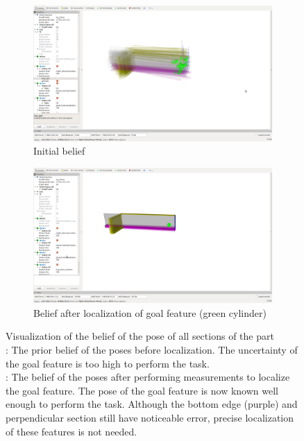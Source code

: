 \documentclass[../thesis.tex]{subfiles}
\begin{document}
\begin{figure}
  \centering
  \begin{subfigure}[b]{0.4\linewidth}
    \includegraphics[width=\linewidth, clip, trim=8in 6in 8.5in 4in]{./Localization/UnlocalizedBelief}
    \caption{Initial belief}
    \label{fig:FullBelief:Unlocalized}
  \end{subfigure}
  \hfill
  \begin{subfigure}[b]{0.4\linewidth}
    \includegraphics[width=\linewidth, clip, trim=7in 7in 10in 4in]{./Localization/LocalizedBelief}
    \caption{Belief after localization of goal feature (green cylinder)}
    \label{fig:FullBelief:Localized}
  \end{subfigure}
  \caption{
    Visualization of the belief of the pose of all sections of the part\\
\protect{}: The prior belief of the poses before localization. The uncertainty of the goal feature is too high to perform the task.\\ 
\protect{}: The belief of the poses after performing measurements to localize the goal feature. The pose of the goal feature is now known well enough to perform the task. Although the bottom edge (purple) and perpendicular section still have noticeable error, precise localization of these features is not needed.
}
  \label{fig:FullBelief}
\end{figure}
\end{document}
